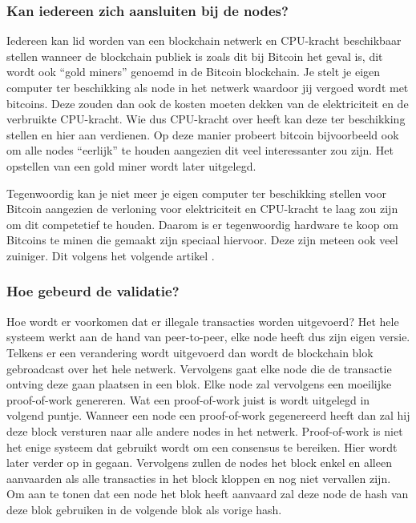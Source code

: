  \subsubsection{Kan iedereen zich aansluiten bij de nodes?}
 Iedereen kan lid worden van een blockchain netwerk en CPU-kracht beschikbaar stellen wanneer de blockchain publiek is zoals dit bij Bitcoin het geval is, dit wordt ook ``gold miners'' genoemd in de Bitcoin blockchain. Je stelt je eigen computer ter beschikking als node in het netwerk waardoor jij vergoed wordt met bitcoins. Deze zouden dan ook de kosten moeten dekken van de elektriciteit en de verbruikte CPU-kracht. Wie dus CPU-kracht over heeft kan deze ter beschikking stellen en hier aan verdienen. Op deze manier probeert  bitcoin bijvoorbeeld ook om alle nodes ``eerlijk'' te houden aangezien dit veel interessanter zou zijn. Het opstellen van een gold miner wordt later uitgelegd. 
 
 Tegenwoordig kan je niet meer je eigen computer ter beschikking stellen voor Bitcoin aangezien de verloning voor elektriciteit en CPU-kracht te laag zou zijn om dit competetief te houden. Daarom is er tegenwoordig hardware te koop om Bitcoins te minen die gemaakt zijn speciaal hiervoor. Deze zijn meteen ook veel zuiniger. Dit volgens het volgende artikel \textcite{Bitcoinmining.com}.
 
 \subsubsection{Hoe gebeurd de validatie?}
 Hoe wordt er voorkomen dat er illegale transacties worden uitgevoerd? Het hele systeem werkt aan de hand van peer-to-peer, elke node heeft dus zijn eigen versie. Telkens er een verandering wordt uitgevoerd dan wordt de blockchain blok gebroadcast over het hele netwerk. Vervolgens gaat elke node die de transactie ontving deze gaan plaatsen in een blok. Elke node zal vervolgens een moeilijke proof-of-work genereren. Wat een proof-of-work juist is wordt uitgelegd in volgend puntje. Wanneer een node een proof-of-work gegenereerd heeft dan zal hij deze block versturen naar alle andere nodes in het netwerk. Proof-of-work is niet het enige systeem dat gebruikt wordt om een consensus te bereiken. Hier wordt later verder op in gegaan. Vervolgens zullen de nodes het block enkel en alleen aanvaarden als alle transacties in het block kloppen en nog niet vervallen zijn. Om aan te tonen dat een node het blok heeft aanvaard zal deze node de hash van deze blok gebruiken in de volgende blok als vorige hash. 

